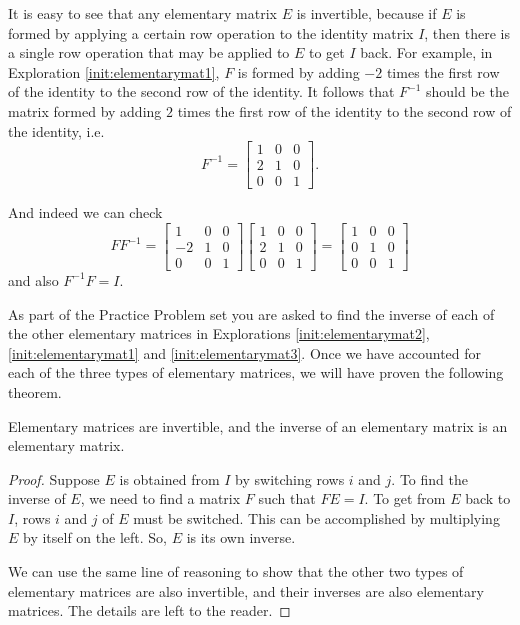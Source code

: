 \documentclass{ximera}
\begin{document}
It is easy to see that any elementary matrix $E$ is invertible, because if $E$ is formed by applying a certain row operation to the identity matrix $I$, then there is a single row operation that may be applied to $E$ to get $I$ back.  For example, in Exploration \ref{init:elementarymat1}, $F$ is formed by adding $-2$ times the first row of the identity to the second row of the identity.  It follows that $F^{-1}$ should be the matrix formed by adding $2$ times the first row of the identity to the second row of the identity, i.e.
 $$F^{-1} =  \begin{bmatrix}  
 1&0&0\\2&1&0\\0&0&1
 \end{bmatrix}.
$$

And indeed we can check $$F F^{-1} = \begin{bmatrix}  
 1&0&0\\-2&1&0\\0&0&1
 \end{bmatrix} \begin{bmatrix}  
 1&0&0\\2&1&0\\0&0&1
 \end{bmatrix} = \begin{bmatrix}  
 1&0&0\\0&1&0\\0&0&1
 \end{bmatrix}$$
 and also $ F^{-1} F = I$.

As part of the Practice Problem set you are asked to find the inverse of each of the other elementary matrices in Explorations \ref{init:elementarymat2}, \ref{init:elementarymat1} and \ref{init:elementarymat3}.  Once we have accounted for each of the three types of elementary matrices, we will have proven the following theorem.  

\begin{theorem}\label{th:elemmatricesinvertible}
Elementary matrices are invertible, and the inverse of an elementary matrix is an elementary matrix.
\end{theorem}

\begin{proof}
Suppose $E$ is obtained from $I$ by switching rows $i$ and $j$.  To find the inverse of $E$, we need to find a matrix $F$ such that $FE=I$.  To get from $E$ back to $I$, rows $i$ and $j$ of $E$ must be switched.  This can be accomplished by multiplying $E$ by itself on the left.  So, $E$ is its own inverse.

We can use the same line of reasoning to show that the other two types of elementary matrices are also invertible, and their inverses are also elementary matrices.  The details are left to the reader. 
\end{proof}
\end{document}
